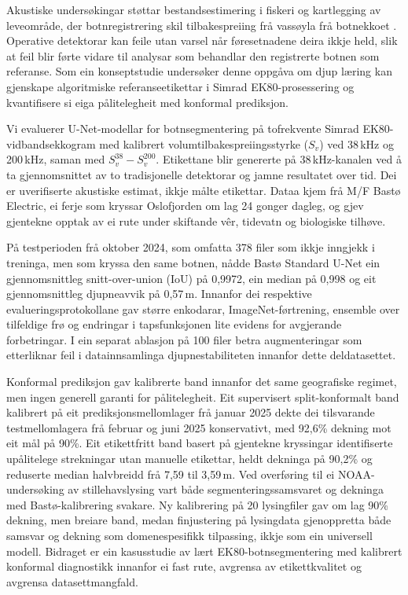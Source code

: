 Akustiske undersøkingar støttar bestandsestimering i fiskeri og kartlegging av leveområde, der botnregistrering skil tilbakespreiing frå vassøyla frå botnekkoet \cite{kenny_overview_2003,ona_mitson_1996,thomas_trawl_2024}. Operative detektorar kan feile utan varsel når føresetnadene deira ikkje held, slik at feil blir førte vidare til analysar som behandlar den registrerte botnen som referanse. Som ein konseptstudie undersøker denne oppgåva om djup læring kan gjenskape algoritmiske referanseetikettar i Simrad EK80-prosessering og kvantifisere si eiga pålitelegheit med konformal prediksjon.

Vi evaluerer U-Net-modellar for botnsegmentering på tofrekvente Simrad EK80-vidbandsekkogram med kalibrert volumtilbakespreiingsstyrke ($S_v$) ved 38\,kHz og 200\,kHz, saman med $S_v^{38}-S_v^{200}$. Etikettane blir genererte på 38\,kHz-kanalen ved å ta gjennomsnittet av to tradisjonelle detektorar og jamne resultatet over tid. Dei er uverifiserte akustiske estimat, ikkje målte etikettar. Dataa kjem frå M/F Bast\o{} Electric, ei ferje som kryssar Oslofjorden om lag 24 gonger dagleg, og gjev gjentekne opptak av ei rute under skiftande vêr, tidevatn og biologiske tilhøve.

På testperioden frå oktober 2024, som omfatta 378 filer som ikkje inngjekk i treninga, men som kryssa den same botnen, nådde Bast\o{} Standard U-Net ein gjennomsnittleg snitt-over-union (IoU) på 0,9972, ein median på 0,998 og eit gjennomsnittleg djupneavvik på 0,57\,m. Innanfor dei respektive evalueringsprotokollane gav større enkodarar, ImageNet-førtrening, ensemble over tilfeldige frø og endringar i tapsfunksjonen lite evidens for avgjerande forbetringar. I ein separat ablasjon på 100 filer betra augmenteringar som etterliknar feil i datainnsamlinga djupnestabiliteten innanfor dette deldatasettet.

Konformal prediksjon gav kalibrerte band innanfor det same geografiske regimet, men ingen generell garanti for pålitelegheit. Eit supervisert split-konformalt band kalibrert på eit prediksjonsmellomlager frå januar 2025 dekte dei tilsvarande testmellomlagera frå februar og juni 2025 konservativt, med 92,6\% dekning mot eit mål på 90\%. Eit etikettfritt band basert på gjentekne kryssingar identifiserte upålitelege strekningar utan manuelle etikettar, heldt dekninga på 90,2\% og reduserte median halvbreidd frå 7,59 til 3,59\,m. Ved overføring til ei NOAA-undersøking av stillehavslysing vart både segmenteringssamsvaret og dekninga med Bast\o{}-kalibrering svakare. Ny kalibrering på 20 lysingfiler gav om lag 90\% dekning, men breiare band, medan finjustering på lysingdata gjenoppretta både samsvar og dekning som domenespesifikk tilpassing, ikkje som ein universell modell. Bidraget er ein kasusstudie av lært EK80-botnsegmentering med kalibrert konformal diagnostikk innanfor ei fast rute, avgrensa av etikettkvalitet og avgrensa datasettmangfald.
